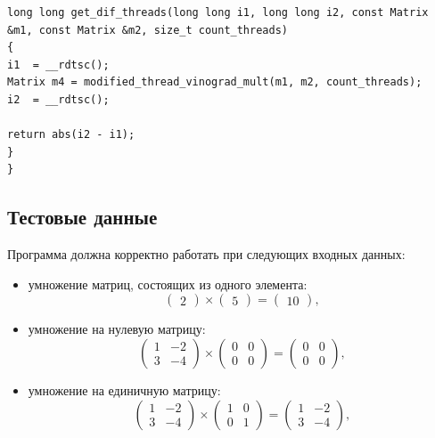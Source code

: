 \documentclass[a4paper,12pt]{article}
\begin{document}
\begin{lstlisting}[label=lst3,caption=Замер времени]
long long get_dif_threads(long long i1, long long i2, const Matrix &m1, const Matrix &m2, size_t count_threads)
{
i1  = __rdtsc();
Matrix m4 = modified_thread_vinograd_mult(m1, m2, count_threads);
i2  = __rdtsc();

return abs(i2 - i1);
}
} 
\end{lstlisting}

\subsection{Тестовые данные}
\label{fig:test_data}

Программа должна корректно работать при следующих 
входных данных:
\\
\begin{itemize}
	\item умножение матриц, состоящих из одного элемента:
	\[ \begin{pmatrix}
	2
	\end{pmatrix} \times 
	\begin{pmatrix}
	5
	\end{pmatrix} =
	\begin{pmatrix}
	10
	\end{pmatrix}, \]
	
	\item умножение на нулевую матрицу:
	\[ \begin{pmatrix}
	1 & -2 \\
	3 & -4
	\end{pmatrix} \times 
	\begin{pmatrix}
	0 & 0 \\
	0 & 0
	\end{pmatrix} =
	\begin{pmatrix}
	0 & 0 \\
	0 & 0
	\end{pmatrix}, \]
	
	\item умножение на единичную матрицу:
	\[ \begin{pmatrix}
	1 & -2 \\
	3 & -4
	\end{pmatrix} \times 
	\begin{pmatrix}
	1 & 0 \\
	0 & 1
	\end{pmatrix} =
	\begin{pmatrix}
	1 & -2 \\
	3 & -4
	\end{pmatrix}, \]
	

\end{itemize}
\end{document}
